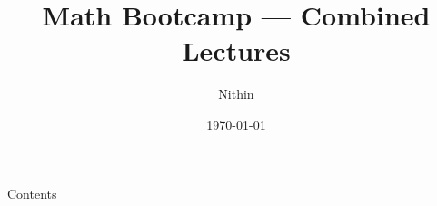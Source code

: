 \documentclass{beamer}
\title{Math Bootcamp — Combined Lectures}
\author{Nithin}
\date{\today}
\begin{document}
\frame{\titlepage}
\begin{frame}[allowframebreaks]{Contents}
  \tableofcontents
\end{frame}



\end{document}
